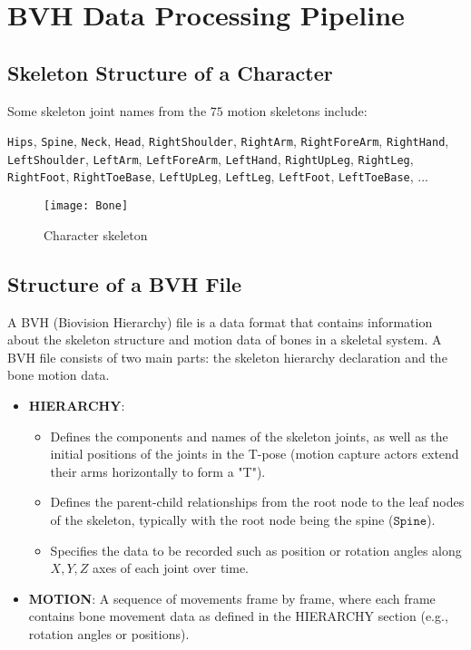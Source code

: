 \chapter{BVH Data Processing Pipeline}
\label{appendix:BVHData}

\section{Skeleton Structure of a Character}
\label{appendix:BVHData:skeleton}

Some skeleton joint names from the $75$ motion skeletons include:

{
\small
\texttt{Hips},
\texttt{Spine},
\texttt{Neck},
\texttt{Head},
\texttt{RightShoulder},
\texttt{RightArm},
\texttt{RightForeArm},
\texttt{RightHand},
\texttt{LeftShoulder},
\texttt{LeftArm},
\texttt{LeftForeArm},
\texttt{LeftHand},
\texttt{RightUpLeg},
\texttt{RightLeg},
\texttt{RightFoot},
\texttt{RightToeBase},
\texttt{LeftUpLeg},
\texttt{LeftLeg},
\texttt{LeftFoot},
\texttt{LeftToeBase},
...
}

\begin{figure}[h]
\centering
\texttt{[image: Bone]}
\caption{Character skeleton}
\label{fig:Bone}
\end{figure}

\section{Structure of a BVH File}
\label{appendix:BVHData:BVHStructure}

A BVH (Biovision Hierarchy) file is a data format that contains information about the skeleton structure and motion data of bones in a skeletal system. A BVH file consists of two main parts: the skeleton hierarchy declaration and the bone motion data.

\begin{itemize}
	\item \textbf{HIERARCHY}:
	
	\begin{itemize}
		\item Defines the components and names of the skeleton joints, as well as the initial positions of the joints in the T-pose (motion capture actors extend their arms horizontally to form a "T").
		\item Defines the parent-child relationships from the root node to the leaf nodes of the skeleton, typically with the root node being the spine ($\texttt{Spine}$).
		\item Specifies the data to be recorded such as position or rotation angles along $X, Y, Z$ axes of each joint over time.
	\end{itemize}
	
	\item \textbf{MOTION}: A sequence of movements frame by frame, where each frame contains bone movement data as defined in the HIERARCHY section (e.g., rotation angles or positions).
\end{itemize}

